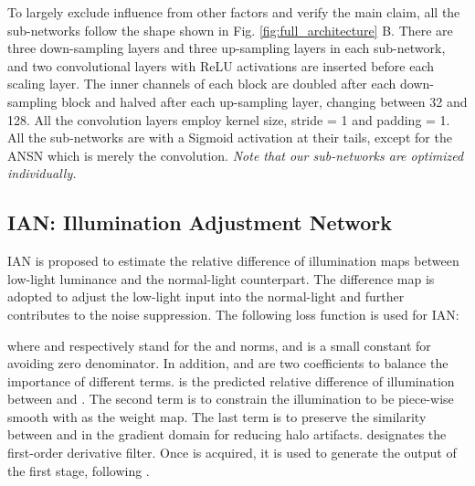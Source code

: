 \documentclass[10pt,twocolumn,letterpaper]{article}
\begin{document}
To largely exclude influence from other factors and verify the main claim, all the sub-networks follow the shape shown in Fig. \ref{fig:full_architecture} B. There are three down-sampling layers and three up-sampling layers in each sub-network, and two convolutional layers with ReLU activations are inserted before each scaling layer. The inner channels of each block are doubled after each down-sampling block and halved after each up-sampling layer, changing between 32 and 128. All the convolution layers employ  kernel size, stride = 1 and padding = 1. All the sub-networks are with a Sigmoid activation at their tails, except for the ANSN which is merely the convolution. \emph{Note that our sub-networks are optimized individually.}






\subsection{IAN: Illumination Adjustment Network}
IAN is proposed to estimate the relative difference of illumination maps between low-light luminance  and the normal-light  counterpart. The difference map is adopted to adjust the low-light input into the normal-light and further contributes to the noise suppression. The following loss function is used for IAN: 

where  and  respectively stand for the  and  norms, and  is a small constant for avoiding zero denominator. In addition,  and  are two coefficients to balance the importance of different terms.  is the predicted relative difference of illumination between  and . The second term is to constrain the illumination  to be piece-wise smooth with  as the weight map. The last term is to preserve the similarity between  and  in the gradient domain for reducing halo artifacts.  designates the first-order derivative filter. Once  is acquired, it is used to generate the output of the first stage, following . 
\end{document}
